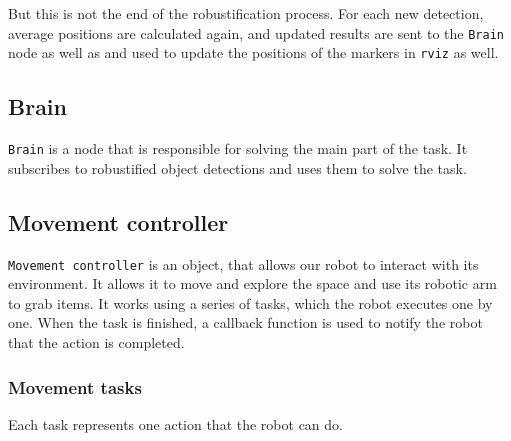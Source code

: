 \documentclass[12pt,a4paper]{article}
\begin{document}
	But this is not the end of the robustification process. For each new detection, average positions are calculated again, and updated results are sent to the \texttt{Brain} node as well as and used to update the positions of the markers in \texttt{rviz} as well. \\
	
	\subsection{Brain}
	\texttt{Brain} is a node that is responsible for solving the main part of the task. It subscribes to robustified object detections and uses them to solve the task. \\
	
	
	\subsection{Movement controller}
	\texttt{Movement controller} is an object, that allows our robot to interact with its environment. It allows it to move and explore the space and use its robotic arm to grab items. It works using a series of tasks, which the robot executes one by one. When the task is finished, a callback function is used to notify the robot that the action is completed. \\

	\subsubsection{Movement tasks}
	Each task represents one action that the robot can do.
\end{document}
